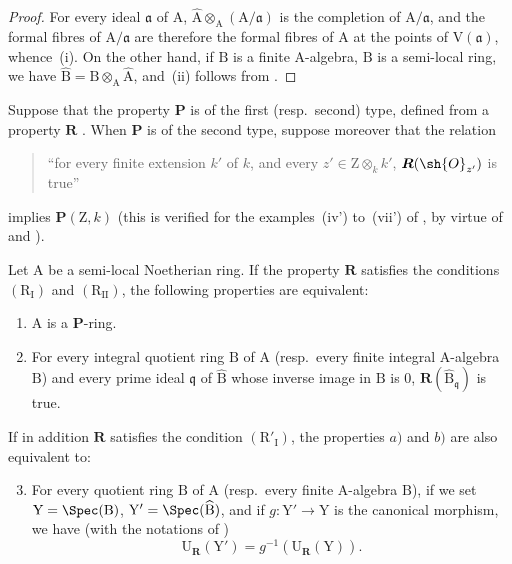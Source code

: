 \begin{proof}
For every ideal $\mathfrak{a}$ of $\mathrm{A}$, $\widehat{\mathrm{A}}\otimes_\mathrm{A}(\mathrm{A}/\mathfrak{a})$ is the completion of $\mathrm{A}/\mathfrak{a}$, and the formal fibres of $\mathrm{A}/\mathfrak{a}$ are therefore the formal fibres of $\mathrm{A}$ at the points of $\mathrm{V}(\mathfrak{a})$, whence~(i).
On the other hand, if $\mathrm{B}$ is a finite $\mathrm{A}$-algebra, $\mathrm{B}$ is a semi-local ring, we have $\widehat{\mathrm{B}}=\mathrm{B}\otimes_\mathrm{A}\widehat{\mathrm{A}}$, and~(ii) follows from .
\end{proof}

\begin{proposition}[7.3.16]
\label{IV.7.3.16}
Suppose that the property $\boldsymbol{P}$ is of the first (resp.~second) type, defined from a property $\boldsymbol{R}$ .
When $\boldsymbol{P}$ is of the second type, suppose moreover that the relation
\begin{quote}
``for every finite extension $k'$ of $k$, and every $z'\in\mathrm{Z}\otimes_k k'$, $\boldsymbol{R}(\sh{O}_{z'})$ is true''
\end{quote}
implies $\boldsymbol{P}(\mathrm{Z},k)$ (this is verified for the examples~(iv') to~(vii') of , by virtue of  and ).

Let $\mathrm{A}$ be a semi-local Noetherian ring.
If the property $\boldsymbol{R}$ satisfies the conditions $(\mathrm{R_I})$ and $(\mathrm{R_{II}})$, the following properties are equivalent:
\begin{enumerate}[label=\emph{\alph*)}]
  \item $\mathrm{A}$ is a $\boldsymbol{P}$-ring.
  \item For every integral quotient ring $\mathrm{B}$ of $\mathrm{A}$ (resp.~every finite integral A-algebra $\mathrm{B}$) and every prime ideal $\mathfrak{q}$ of $\widehat{\mathrm{B}}$ whose inverse image in $\mathrm{B}$ is $0$, $\boldsymbol{R}(\widehat{\mathrm{B}}_\mathfrak{q})$ is true.
\end{enumerate}
If in addition $\boldsymbol{R}$ satisfies the condition $(\mathrm{R}'_\mathrm{I})$, the properties $a)$ and $b)$ are also equivalent to:
\begin{enumerate}[label=\emph{\alph*)}]
  \setcounter{enumi}{2}
  \item For every quotient ring $\mathrm{B}$ of $\mathrm{A}$ (resp.~every finite A-algebra $\mathrm{B}$), if we set $\mathrm{Y}=\Spec(\mathrm{B})$, $\mathrm{Y}'=\Spec(\widehat{\mathrm{B}})$, and if $g:\mathrm{Y}'\to\mathrm{Y}$ is the canonical morphism, we have (with the notations of )
  \[
    \mathrm{U}_{\boldsymbol{R}}(\mathrm{Y}')=g^{-1}(\mathrm{U}_{\boldsymbol{R}}(\mathrm{Y})).
    \tag{7.3.16.1}
  \]
\end{enumerate}
\end{proposition}

